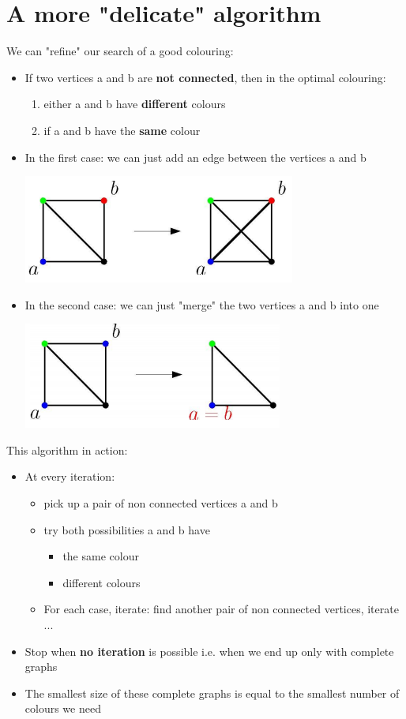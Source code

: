 \documentclass{article}[18pt]
\begin{document}
\section{A more "delicate" algorithm}
We can "refine" our search of a good colouring:
\begin{itemize}
\item If two vertices a and b are \textbf{not connected}, then in the optimal colouring:
\begin{enumerate}
	\item either a and b have \textbf{different} colours
	\item if a and b have the \textbf{same} colour
\end{enumerate}
\item In the first case: we can just add an edge between the vertices a and b
\begin{center}
\includegraphics[scale=0.7]{"first case"}
\end{center}
\item In the second case: we can just "merge" the two vertices a and b into one
\begin{center}
\includegraphics[scale=0.7]{"first case1"}
\end{center}
\end{itemize}
This algorithm in action:
\begin{itemize}
\item At every iteration:
\begin{itemize}
\item pick up a pair of non connected vertices a and b
\item try both possibilities a and b have
\begin{itemize}
\item the same colour
\item different colours
\end{itemize}
\item For each case, iterate: find another pair of non connected vertices, iterate ...
\end{itemize}
\item Stop when \textbf{no iteration} is possible i.e. when we end up only with complete graphs
\item The smallest size of these complete graphs is equal to the smallest number of colours we need
\end{itemize}
\end{document}
